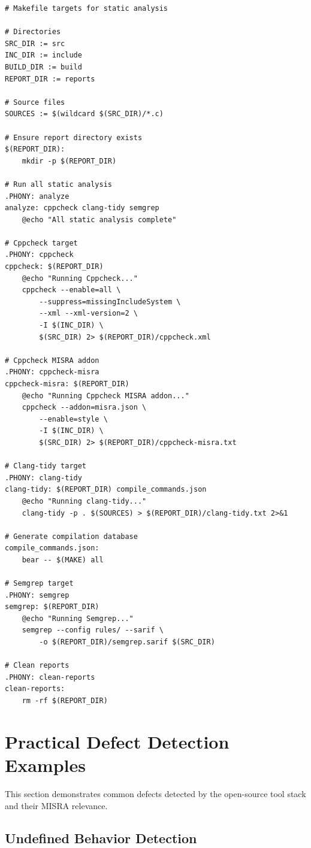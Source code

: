 \documentclass[11pt,letterpaper]{report}
\begin{document}
\begin{verbatim}
# Makefile targets for static analysis

# Directories
SRC_DIR := src
INC_DIR := include
BUILD_DIR := build
REPORT_DIR := reports

# Source files
SOURCES := $(wildcard $(SRC_DIR)/*.c)

# Ensure report directory exists
$(REPORT_DIR):
	mkdir -p $(REPORT_DIR)

# Run all static analysis
.PHONY: analyze
analyze: cppcheck clang-tidy semgrep
	@echo "All static analysis complete"

# Cppcheck target
.PHONY: cppcheck
cppcheck: $(REPORT_DIR)
	@echo "Running Cppcheck..."
	cppcheck --enable=all \
		--suppress=missingIncludeSystem \
		--xml --xml-version=2 \
		-I $(INC_DIR) \
		$(SRC_DIR) 2> $(REPORT_DIR)/cppcheck.xml

# Cppcheck MISRA addon
.PHONY: cppcheck-misra
cppcheck-misra: $(REPORT_DIR)
	@echo "Running Cppcheck MISRA addon..."
	cppcheck --addon=misra.json \
		--enable=style \
		-I $(INC_DIR) \
		$(SRC_DIR) 2> $(REPORT_DIR)/cppcheck-misra.txt

# Clang-tidy target
.PHONY: clang-tidy
clang-tidy: $(REPORT_DIR) compile_commands.json
	@echo "Running clang-tidy..."
	clang-tidy -p . $(SOURCES) > $(REPORT_DIR)/clang-tidy.txt 2>&1

# Generate compilation database
compile_commands.json:
	bear -- $(MAKE) all

# Semgrep target
.PHONY: semgrep
semgrep: $(REPORT_DIR)
	@echo "Running Semgrep..."
	semgrep --config rules/ --sarif \
		-o $(REPORT_DIR)/semgrep.sarif $(SRC_DIR)

# Clean reports
.PHONY: clean-reports
clean-reports:
	rm -rf $(REPORT_DIR)
\end{verbatim}

\chapter{Practical Defect Detection Examples}

This section demonstrates common defects detected by the open-source tool stack and their MISRA relevance.

\section{Undefined Behavior Detection}
\end{document}
